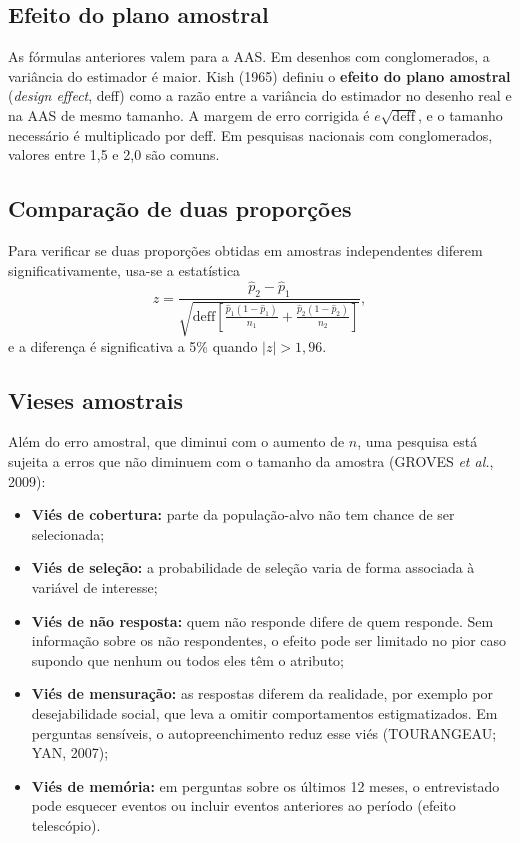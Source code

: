 \documentclass[12pt,a4paper]{article}
\begin{document}
\subsection{Efeito do plano amostral}

As fórmulas anteriores valem para a AAS. Em desenhos com conglomerados, a variância do estimador é maior. Kish (1965) definiu o \textbf{efeito do plano amostral} (\textit{design effect}, deff) como a razão entre a variância do estimador no desenho real e na AAS de mesmo tamanho. A margem de erro corrigida é $e\sqrt{\text{deff}}$, e o tamanho necessário é multiplicado por deff. Em pesquisas nacionais com conglomerados, valores entre 1,5 e 2,0 são comuns.

\subsection{Comparação de duas proporções}

Para verificar se duas proporções obtidas em amostras independentes diferem significativamente, usa-se a estatística
\begin{equation}
z = \frac{\hat{p}_2 - \hat{p}_1}{\sqrt{\text{deff}\left[\frac{\hat{p}_1(1-\hat{p}_1)}{n_1} + \frac{\hat{p}_2(1-\hat{p}_2)}{n_2}\right]}},
\label{eq:dif}
\end{equation}
e a diferença é significativa a 5\% quando $|z| > 1{,}96$.

\subsection{Vieses amostrais}

Além do erro amostral, que diminui com o aumento de $n$, uma pesquisa está sujeita a erros que não diminuem com o tamanho da amostra (GROVES \textit{et al.}, 2009):

\begin{itemize}
    \item \textbf{Viés de cobertura:} parte da população-alvo não tem chance de ser selecionada;
    \item \textbf{Viés de seleção:} a probabilidade de seleção varia de forma associada à variável de interesse;
    \item \textbf{Viés de não resposta:} quem não responde difere de quem responde. Sem informação sobre os não respondentes, o efeito pode ser limitado no pior caso supondo que nenhum ou todos eles têm o atributo;
    \item \textbf{Viés de mensuração:} as respostas diferem da realidade, por exemplo por desejabilidade social, que leva a omitir comportamentos estigmatizados. Em perguntas sensíveis, o autopreenchimento reduz esse viés (TOURANGEAU; YAN, 2007);
    \item \textbf{Viés de memória:} em perguntas sobre os últimos 12 meses, o entrevistado pode esquecer eventos ou incluir eventos anteriores ao período (efeito telescópio).
\end{itemize}
\end{document}
